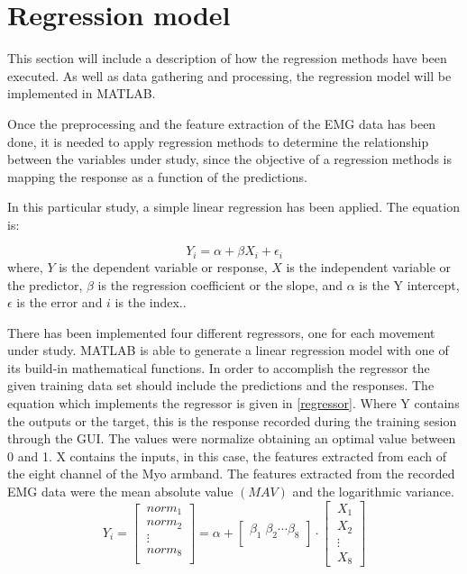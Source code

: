 \section{Regression model}

This section will include a description of how the regression methods have been executed. As well as data gathering and processing, the regression model will be implemented in MATLAB.

Once the preprocessing and the feature extraction of the EMG data has been done, it is needed to apply regression methods to determine the relationship between the variables under study, since the objective of a regression methods is mapping the response  as a function of the predictions.\cite{hahne2014}

In this particular study, a simple linear regression has been applied. The equation is:

\begin{equation} %
Y_i = \alpha + \beta X_i + \epsilon_i
\end{equation}
where, $Y$ is the dependent variable or response, $X$ is the independent variable or the predictor, $\beta$ is the regression coefficient or the slope, and $\alpha$ is the Y intercept,  $\epsilon$ is the error and $i$ is the index.\cite{zar2009}.

There has been implemented four different regressors, one for each movement under study. MATLAB is able to generate a linear regression model with one of its build-in mathematical functions. In order to accomplish the regressor the given training data set should include the predictions and the responses.
 The equation which implements the regressor is given in \ref{regressor}. Where Y contains the outputs or the target, this is the response recorded during the training sesion through the GUI. The values were normalize obtaining an optimal value between 0 and 1. X contains the inputs, in this case, the features extracted from each of the eight channel of the Myo armband. The features extracted from the recorded EMG data were the mean absolute value $\left( MAV\right)$ and  the logarithmic variance. %
\begin{equation}
	Y_i=\begin{bmatrix} 
	\ norm_1 \\ 
	\ norm_2\\ 
	\ \vdots\\
	\ norm_8\\
	\end{bmatrix}=
	\alpha +
	\begin{bmatrix} 
	\beta_1 \; \beta_2 \cdots \beta_8\\ 
	\end{bmatrix}
	\cdot 
		\begin{bmatrix} 
	\ X_1 \\ 
	\ X_2\\ 
	\ \vdots\\
	\ X_8
	\label{regressor}
	\end{bmatrix}
\end{equation}


